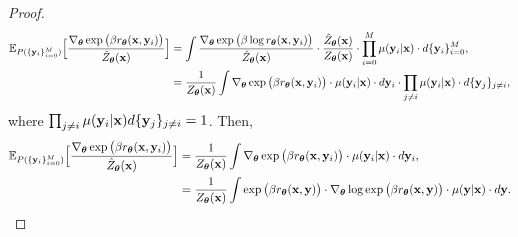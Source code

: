 \begin{proof}
\begin{align*}
\mathbb{E}_{P(\{\mathbf{y}_i \}_{i=0}^M)
}
\Big[
\frac{\nabla_{\boldsymbol\theta}\exp\big( 
\beta
r_{\boldsymbol\theta}(\mathbf{x}, \mathbf{y}_i)
\big)} 
{\hat{Z}_{\boldsymbol\theta}(\mathbf{x})
}
\Big]
& =
\int
\frac{\nabla_{\boldsymbol\theta}\exp\big(
\beta
\log 
r_{\boldsymbol\theta}(\mathbf{x}, \mathbf{y}_i)
\big)}
{\hat{Z}_{\boldsymbol\theta}(\mathbf{x})}
\cdot
\frac{\hat{Z}_{\boldsymbol\theta}(\mathbf{x})} {Z_{\boldsymbol\theta}(\mathbf{x})}
\cdot
\prod_{i=0}^M \mu(\mathbf{y}_i | \mathbf{x})
\cdot
d \{ \mathbf{y}_i \}_{i=0}^M,
\\
& =
\frac{1}{Z_{\boldsymbol\theta}(\mathbf{x})}
\int
\nabla_{\boldsymbol\theta}\exp\big( 
\beta
r_{\boldsymbol\theta}(\mathbf{x}, \mathbf{y}_i)
\big)
\cdot
\mu(\mathbf{y}_i | \mathbf{x})
\cdot
d\mathbf{y}_i
\cdot
\prod_{j \neq i}
\mu(\mathbf{y}_i | \mathbf{x}) 
\cdot
d\{\mathbf{y}_j\}_{j\neq i},
\end{align*}
where 
$
\prod_{j \neq i}
\mu(\mathbf{y}_i | \mathbf{x}) d\{\mathbf{y}_j\}_{j\neq i} = 1
$.
Then,
\begin{align*}
\mathbb{E}_{P(\{\mathbf{y}_i \}_{i=0}^M)
}
\Big[
\frac{\nabla_{\boldsymbol\theta}\exp\big( 
\beta
r_{\boldsymbol\theta}(\mathbf{x}, \mathbf{y}_i)
\big)} 
{\hat{Z}_{\boldsymbol\theta}(\mathbf{x})
}
\Big]
& =
\frac{1}{Z_{\boldsymbol\theta}(\mathbf{x})}
\int
\nabla_{\boldsymbol\theta}\exp\big( 
\beta
r_{\boldsymbol\theta}(\mathbf{x}, \mathbf{y}_i)
\big)
\cdot
\mu(\mathbf{y}_i | \mathbf{x})
\cdot
d\mathbf{y}_i,
\\
& =
\frac{1}{Z_{\boldsymbol\theta}(\mathbf{x})}
\int
\exp\big(
\beta
r_{\boldsymbol\theta}(\mathbf{x}, \mathbf{y})
\big)
\cdot
\nabla_{\boldsymbol\theta}
\log
\exp\big(
\beta
r_{\boldsymbol\theta}(\mathbf{x}, \mathbf{y})
\big)
\cdot
\mu(\mathbf{y} | \mathbf{x}) 
\cdot
d\mathbf{y}.
\end{align*}


\end{proof}
